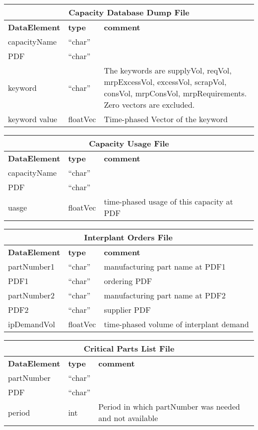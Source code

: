 \begin{tabular}{llp{4in}}
\multicolumn{3}{c}{{\bf Capacity Database Dump File}}\\ \hline\hline
{\bf DataElement} &  {\bf type}  &   {\bf comment} \\ \hline
capacityName & ``char''  \\
PDF & ``char''  \\
keyword & ``char''  & The keywords are supplyVol, reqVol, mrpExcessVol, excessVol,
   scrapVol, consVol, mrpConsVol, mrpRequirements.
   Zero vectors are excluded.\\
keyword value  & floatVec &  Time-phased Vector of the keyword \\
\end{tabular}

\vspace{.5in}

\begin{tabular}{llp{4in}}
\multicolumn{3}{c}{{\bf Capacity Usage File}}\\ \hline\hline
{\bf DataElement} &  {\bf type}  &   {\bf comment} \\ \hline
capacityName &  ``char''     \\ 
PDF   & ``char''  \\
uasge          & floatVec &  time-phased usage of this capacity at PDF\\
\end{tabular}

\vspace{.5in}

\begin{tabular}{llp{4in}}
\multicolumn{3}{c}{{\bf Interplant Orders File}}\\ \hline\hline
{\bf DataElement} &  {\bf type}  &   {\bf comment} \\ \hline
partNumber1 &  ``char'' &  manufacturing part name at PDF1  \\ 
PDF1   & ``char'' & ordering PDF \\
partNumber2 &  ``char'' & manufacturing part name at PDF2    \\ 
PDF2   & ``char'' & supplier PDF \\
ipDemandVol & floatVec &  time-phased volume of interplant demand \\
\end{tabular}

\vspace{.5in}

\begin{tabular}{llp{4in}}
\multicolumn{3}{c}{{\bf Critical Parts List File}}\\ \hline\hline
{\bf DataElement} &  {\bf type}  &   {\bf comment} \\ \hline
partNumber &  ``char''     \\ 
PDF   & ``char''  \\
period & int & Period in which partNumber was needed and not available
\end{tabular}

